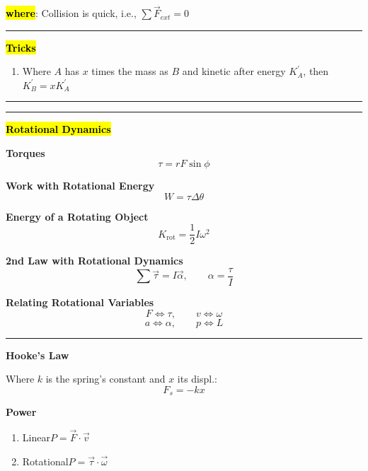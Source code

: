 \documentclass[	DIV=calc,%
							paper=a4,%
							fontsize=11pt,%
							twocolumn]{scrartcl} %
\newcommand{\hformbar}[1]{\vspace{5pt}\hrule\vspace{10pt}} %
\newcommand{\formdesc}[1]{\noindent\textbf{#1}}
\begin{document}
\hl{\textbf{where}}: Collision is quick, i.e., $\sum\vec F_{ext}=0$
\hformbar{}
\hl{\textbf{Tricks}}
\begin{enumerate}
    \item Where $A$ has $x$ times the mass as $B$ and kinetic after energy $K^\prime_A$, then $K^\prime_B=xK^\prime_A$
\end{enumerate}

\hformbar{}
\hformbar{}

\formdesc{\hl{Rotational Dynamics}}

\textbf{Torques}
\begin{equation}
    \tau = rF\sin\phi
\end{equation}

\textbf{Work with Rotational Energy}
\begin{equation}
    W=\tau\Delta\theta
\end{equation}

\textbf{Energy of a Rotating Object}
\begin{equation}
    K_{\text{rot}}=\frac{1}{2}I\omega^2
\end{equation}

\textbf{2nd Law with Rotational Dynamics}
\begin{equation}
    \sum\vec\tau=I\vec\alpha,\qquad\alpha=\frac{\tau}{I}
\end{equation}

\textbf{Relating Rotational Variables}
    $$F\iff\tau,\qquad  v\iff\omega$$
    $$a\iff\alpha,\qquad p\iff L$$
\hformbar{}

\sethlcolor{pink}{\formdesc{\hl{Misc.}}}

\textbf{Hooke's Law}

Where $k$ is the spring's constant and $x$ its displ.:
\begin{equation}
    F_s = -kx
\end{equation}

\textbf{Power}
\begin{enumerate}
    \item Linear\qquad\qquad$P=\vec F\cdot\vec v$
    \item Rotational\qquad$P=\vec\tau\cdot\vec\omega$
\end{enumerate}
\end{document}
